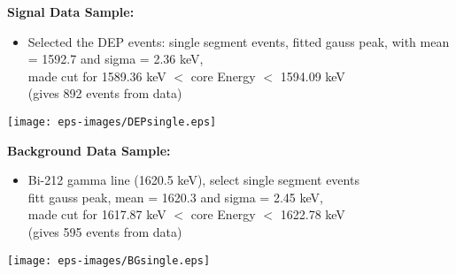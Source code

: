 \documentclass[landscape]{slides}
\begin{document}
\begin{slide}

\textbf{Signal Data Sample:}

\begin{itemize}

\item Selected the DEP events: single segment events,
	fitted gauss peak, with mean = 1592.7 and sigma = 2.36 keV, 
	\\ made cut for 1589.36 keV $<$ core Energy $<$ 1594.09 keV
	\\ (gives 892 events from data)

\end{itemize}

\begin{center}
\texttt{[image: eps-images/DEPsingle.eps]}
\end{center}

\end{slide}

\begin{slide}

\textbf{Background Data Sample:}

\begin{itemize}

\item Bi-212 gamma line (1620.5 keV), select single segment events \\
	fitt gauss peak, mean = 1620.3 and sigma = 2.45 keV, 
	\\ made cut for 1617.87 keV $<$ core Energy $<$ 1622.78 keV
	\\ (gives 595 events from data)

\end{itemize}

\begin{center}
\texttt{[image: eps-images/BGsingle.eps]}
\end{center}

\end{slide}
\end{document}
